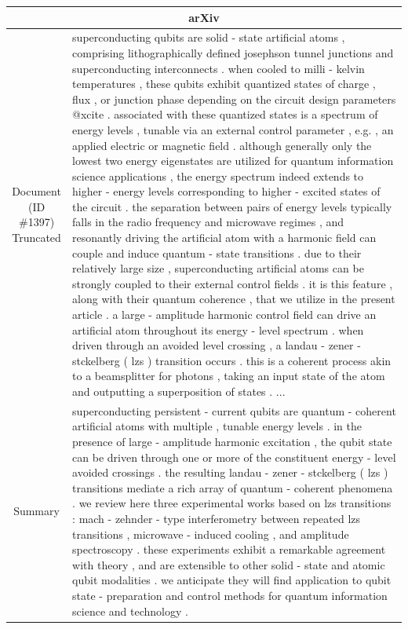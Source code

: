 \begin{table}[h!]
\begin{tabular}{c|p{}}
  \multicolumn{2}{c}{arXiv} \\\hline
  \makecell{Document\\(ID \#1397)\\Truncated} & superconducting qubits are solid - state artificial atoms , comprising lithographically defined josephson tunnel junctions and superconducting interconnects . when cooled to milli - kelvin temperatures , these qubits exhibit quantized states of charge , flux , or junction phase depending on the circuit design parameters @xcite . associated with these quantized states is a spectrum of energy levels , tunable via an external control parameter , e.g. , an applied electric or magnetic field . although generally only the lowest two energy eigenstates are utilized for quantum information science applications , the energy spectrum indeed extends to higher - energy levels corresponding to higher - excited states of the circuit . the separation between pairs of energy levels typically falls in the radio frequency and microwave regimes , and resonantly driving the artificial atom with a harmonic field can couple and induce quantum - state transitions . due to their relatively large size , superconducting artificial atoms can be strongly coupled to their external control fields . it is this feature , along with their quantum coherence , that we utilize in the present article . a large - amplitude harmonic control field can drive an artificial atom throughout its energy - level spectrum . when driven through an avoided level crossing , a landau - zener - stckelberg ( lzs ) transition occurs . this is a coherent process akin to a beamsplitter for photons , taking an input state of the atom and outputting a superposition of states . ...\\\hline
  Summary & superconducting persistent - current qubits are quantum - coherent artificial atoms with multiple , tunable energy levels . in the presence of large - amplitude harmonic excitation , the qubit state can be driven through one or more of the constituent energy - level avoided crossings . the resulting landau - zener - stckelberg ( lzs ) transitions mediate a rich array of quantum - coherent phenomena . we review here three experimental works based on lzs transitions : mach - zehnder - type interferometry between repeated lzs transitions , microwave - induced cooling , and amplitude spectroscopy . these experiments exhibit a remarkable agreement with theory , and are extensible to other solid - state and atomic qubit modalities . we anticipate they will find application to qubit state - preparation and control methods for quantum information science and technology . \\\hline

\end{tabular}
\end{table}
